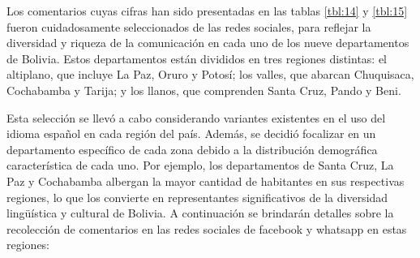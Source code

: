 Los comentarios cuyas cifras han sido presentadas en las tablas \ref{tbl:14} y \ref{tbl:15} fueron cuidadosamente seleccionados de las redes sociales, para reflejar la diversidad y riqueza de la comunicación en cada uno de los nueve departamentos de Bolivia. Estos departamentos están divididos en tres regiones distintas: el altiplano, que incluye La Paz, Oruro y Potosí; los valles, que abarcan Chuquisaca, Cochabamba y Tarija; y los llanos, que comprenden Santa Cruz, Pando y Beni.

Esta selección se llevó a cabo considerando variantes existentes en el uso del idioma español en cada región del país. Además, se decidió focalizar en un departamento específico de cada zona debido a la distribución demográfica característica de cada uno. Por ejemplo, los departamentos de Santa Cruz, La Paz y Cochabamba albergan la mayor cantidad de habitantes en sus respectivas regiones, lo que los convierte en representantes significativos de la diversidad lingüística y cultural de Bolivia. A continuación se brindarán detalles sobre la recolección de comentarios en las redes sociales de facebook y whatsapp en estas regiones:



